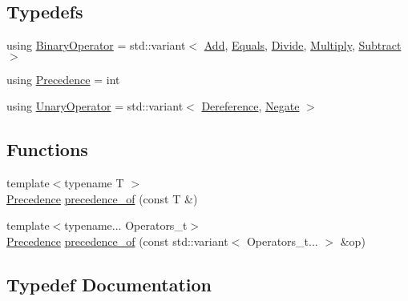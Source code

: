 \subsection*{Typedefs}
\begin{DoxyCompactItemize}
\item 
using \mbox{\hyperlink{namespacexd_1_1parser_1_1expr_1_1op_a5d85beecf0ae4a43576fdeacb264886a}{Binary\+Operator}} = std\+::variant$<$ \mbox{\hyperlink{structxd_1_1parser_1_1expr_1_1op_1_1_add}{Add}}, \mbox{\hyperlink{structxd_1_1parser_1_1expr_1_1op_1_1_equals}{Equals}}, \mbox{\hyperlink{structxd_1_1parser_1_1expr_1_1op_1_1_divide}{Divide}}, \mbox{\hyperlink{structxd_1_1parser_1_1expr_1_1op_1_1_multiply}{Multiply}}, \mbox{\hyperlink{structxd_1_1parser_1_1expr_1_1op_1_1_subtract}{Subtract}} $>$
\item 
using \mbox{\hyperlink{namespacexd_1_1parser_1_1expr_1_1op_ae27abd4a02cd8125663cb2bacac299b2}{Precedence}} = int
\item 
using \mbox{\hyperlink{namespacexd_1_1parser_1_1expr_1_1op_ac61563bdf571a06b442d1fe819ff75bd}{Unary\+Operator}} = std\+::variant$<$ \mbox{\hyperlink{structxd_1_1parser_1_1expr_1_1op_1_1_dereference}{Dereference}}, \mbox{\hyperlink{structxd_1_1parser_1_1expr_1_1op_1_1_negate}{Negate}} $>$
\end{DoxyCompactItemize}
\subsection*{Functions}
\begin{DoxyCompactItemize}
\item 
{\footnotesize template$<$typename T $>$ }\\\mbox{\hyperlink{namespacexd_1_1parser_1_1expr_1_1op_ae27abd4a02cd8125663cb2bacac299b2}{Precedence}} \mbox{\hyperlink{namespacexd_1_1parser_1_1expr_1_1op_a2734a883663419ac1509c376c26d33a8}{precedence\+\_\+of}} (const T \&)
\item 
{\footnotesize template$<$typename... Operators\+\_\+t$>$ }\\\mbox{\hyperlink{namespacexd_1_1parser_1_1expr_1_1op_ae27abd4a02cd8125663cb2bacac299b2}{Precedence}} \mbox{\hyperlink{namespacexd_1_1parser_1_1expr_1_1op_a5e23392eca2c04ab3946619f553be022}{precedence\+\_\+of}} (const std\+::variant$<$ Operators\+\_\+t... $>$ \&op)
\end{DoxyCompactItemize}


\subsection{Typedef Documentation}
\mbox{\label{namespacexd_1_1parser_1_1expr_1_1op_a5d85beecf0ae4a43576fdeacb264886a}} 
